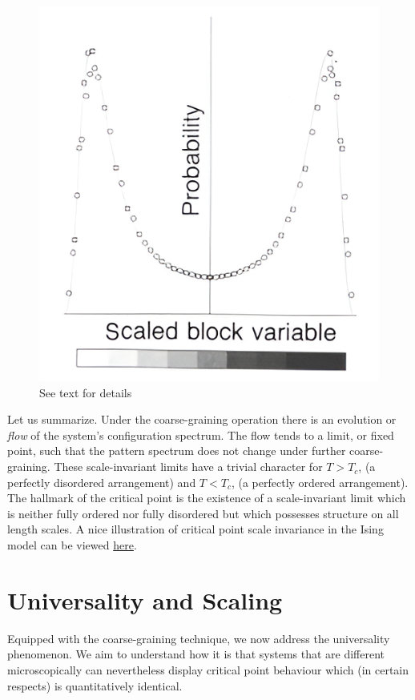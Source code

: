 \documentclass[
  letterpaper,
  enabledeprecatedfontcommands]{report}
\begin{document}
\begin{figure}
\begin{minipage}{0.50\linewidth}
\end{minipage}%
\newline
\begin{minipage}{\linewidth}

\includegraphics[width=0.5\linewidth,height=\textheight,keepaspectratio]{phase-transitions/Figs/scaled_block_variable.png}

\end{minipage}%

\caption{\label{fig-c2}See text for details}

\end{figure}%

Let us summarize. Under the coarse-graining operation there is an
evolution or \emph{flow} of the system's configuration spectrum. The
flow tends to a limit, or fixed point, such that the pattern spectrum
does not change under further coarse-graining. These scale-invariant
limits have a trivial character for \(T>T_c\), (a perfectly disordered
arrangement) and \(T< T_c\), (a perfectly ordered arrangement). The
hallmark of the critical point is the existence of a scale-invariant
limit which is neither fully ordered nor fully disordered but which
possesses structure on all length scales. A nice illustration of
critical point scale invariance in the Ising model can be viewed
\href{https://www.youtube.com/watch?v=fi-g2ET97W8&ab_channel=DouglasAshton}{here}.

\section{Universality and Scaling}\label{universality-and-scaling}

Equipped with the coarse-graining technique, we now address the
universality phenomenon. We aim to understand how it is that systems
that are different microscopically can nevertheless display critical
point behaviour which (in certain respects) is quantitatively identical.
\end{document}
